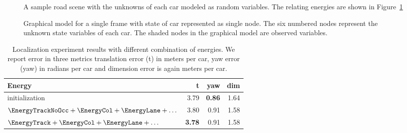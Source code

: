 \begin{figure}
  \centering
  \newcommand{\imagewidth}{\columnwidth}
  
  \caption{A sample road scene with the unknowns of each car modeled as random variables. 
  The relating energies are shown in Figure~\ref{fig:graphmodel}}
\end{figure}
\begin{figure}
    
    \caption{Graphical model for a single frame with state of car represented
    as single node.  The six numbered nodes represent the unknown state variables of each car. The shaded nodes in the graphical model are observed variables. }
  \label{fig:graphmodel}
\end{figure}

\begin{table}
  \centering
  \begin{tabular}{lrrr}
    \toprule
    Energy & t & yaw & dim \\
    \midrule
    initialization                                                                                  & 3.79 & \textbf{0.86} & 1.64 \\
    $\EnergyTrackNoOcc+\EnergyCol + \EnergyLane + \dots$  & 3.80 & 0.91 & 1.58 \\
    $\EnergyTrack+\EnergyCol + \EnergyLane + \dots$ & \textbf{3.78} & 0.91 & 1.58 \\
    \bottomrule
  \end{tabular}
  \caption{Localization experiment results with different combination of energies. We report error in three metrics translation error (t) in meters per car, yaw error (yaw) in radians per car and dimension error is again meters per car.}
  \label{tab:localizationExperiment}
\end{table}
